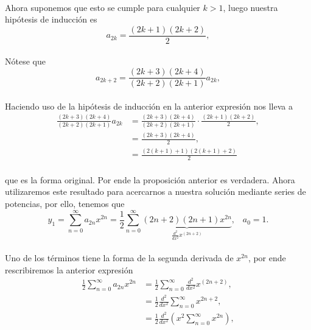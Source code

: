 \documentclass{article}
\begin{document}
\paragraph{}Ahora suponemos que esto se cumple para cualquier $k>1$, luego nuestra hipótesis de inducción es
$$
a_{2k} = \frac{(2k +1)(2k + 2)}{2},
$$
\paragraph{}Nótese que
$$a_{2k+2} = \frac{(2k+3)(2k+4)}{(2k+2)(2k+1)}a_{2k},$$
\paragraph{} Haciendo uso de la hipótesis de inducción en la anterior expresión nos lleva a
\begin{align*}
\frac{(2k+3)(2k+4)}{(2k+2)(2k+1)}a_{2k} &= \frac{(2k+3)(2k+4)}{(2k+2)(2k+1)} \cdot \frac{(2k+1)(2k+2)}{2},\\
&= \frac{(2k+3)(2k+4)}{2},\\
&= \frac{(2(k +1) + 1)(2(k+1)+2)}{2}
\end{align*}
\paragraph{} que es la forma original. Por ende la proposición anterior es verdadera. Ahora utilizaremos este resultado para acercarnos a nuestra solución mediante series de potencias, por ello, tenemos que
$$y_1 = \sum_{n=0}^{\infty} a_{2n}x^{2n} = \frac{1}{2} \sum_{n=0}^{\infty} \underbrace{(2n+2)(2n+1)x^{2n}}_{\frac{d^2}{dx^2} x^{(2n+2)}}, \hspace{10pt} a_0 = 1.$$
\paragraph{}Uno de los términos tiene la forma de la segunda derivada de $x^{2n}$, por ende rescribiremos la anterior expresión
\begin{align*}
\frac{1}{2} \sum_{n=0}^{\infty} a_{2n}x^{2n} &= \frac{1}{2} \sum_{n=0}^{\infty}\frac{d^2}{dx^2} x^{(2n+2)},\\
&= \frac{1}{2} \frac{d^2}{dx^2}\sum_{n=0}^{\infty} x^{2n+2},\\
&= \frac{1}{2} \frac{d^2}{dx^2} \left(x^2 \sum_{n=0}^{\infty} x^{2n}\right),\\
\end{align*}
\end{document}
